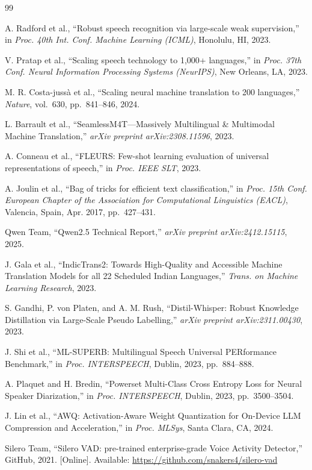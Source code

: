 \documentclass[12pt, onecolumn]{IEEEtran}
\begin{document}
\begin{thebibliography}{99}

 A. Radford et al., ``Robust speech recognition via large-scale weak supervision,'' in \textit{Proc. 40th Int. Conf. Machine Learning (ICML)}, Honolulu, HI, 2023.

 V. Pratap et al., ``Scaling speech technology to 1,000+ languages,'' in \textit{Proc. 37th Conf. Neural Information Processing Systems (NeurIPS)}, New Orleans, LA, 2023.

 M. R. Costa-juss\`a et al., ``Scaling neural machine translation to 200 languages,'' \textit{Nature}, vol.~630, pp.~841--846, 2024.

 L. Barrault et al., ``SeamlessM4T---Massively Multilingual \& Multimodal Machine Translation,'' \textit{arXiv preprint arXiv:2308.11596}, 2023.

 A. Conneau et al., ``FLEURS: Few-shot learning evaluation of universal representations of speech,'' in \textit{Proc. IEEE SLT}, 2023.

 A. Joulin et al., ``Bag of tricks for efficient text classification,'' in \textit{Proc. 15th Conf. European Chapter of the Association for Computational Linguistics (EACL)}, Valencia, Spain, Apr. 2017, pp.~427--431.

 Qwen Team, ``Qwen2.5 Technical Report,'' \textit{arXiv preprint arXiv:2412.15115}, 2025.

 J. Gala et al., ``IndicTrans2: Towards High-Quality and Accessible Machine Translation Models for all 22 Scheduled Indian Languages,'' \textit{Trans. on Machine Learning Research}, 2023.

 S. Gandhi, P. von Platen, and A. M. Rush, ``Distil-Whisper: Robust Knowledge Distillation via Large-Scale Pseudo Labelling,'' \textit{arXiv preprint arXiv:2311.00430}, 2023.

 J. Shi et al., ``ML-SUPERB: Multilingual Speech Universal PERformance Benchmark,'' in \textit{Proc. INTERSPEECH}, Dublin, 2023, pp.~884--888.

 A. Plaquet and H. Bredin, ``Powerset Multi-Class Cross Entropy Loss for Neural Speaker Diarization,'' in \textit{Proc. INTERSPEECH}, Dublin, 2023, pp.~3500--3504.

 J. Lin et al., ``AWQ: Activation-Aware Weight Quantization for On-Device LLM Compression and Acceleration,'' in \textit{Proc. MLSys}, Santa Clara, CA, 2024.

 Silero Team, ``Silero VAD: pre-trained enterprise-grade Voice Activity Detector,'' GitHub, 2021. [Online]. Available: \url{https://github.com/snakers4/silero-vad}

\end{thebibliography}
\end{document}
